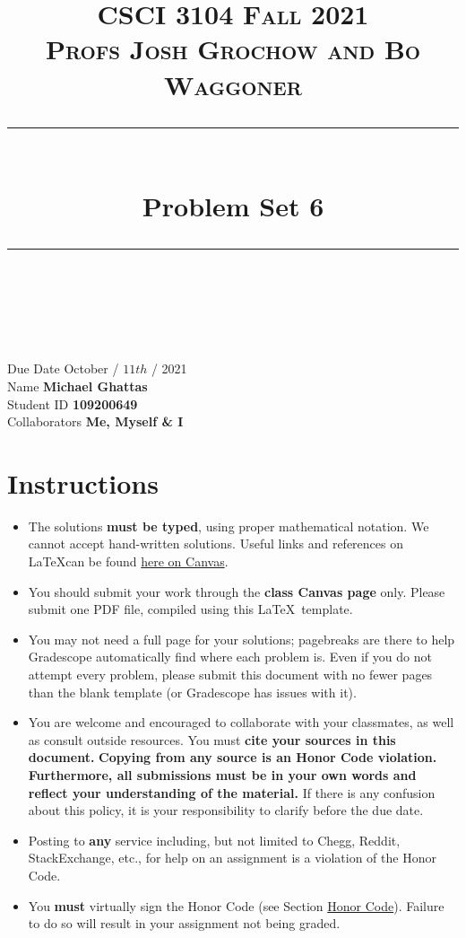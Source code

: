 \documentclass[11pt]{article}
\title{
\normalfont \normalsize 
\textsc{CSCI 3104 Fall 2021 \\ 
Profs Josh Grochow and Bo Waggoner} \\
[10pt] 
\rule{\linewidth}{0.5pt} \\[6pt] 
\huge Problem Set 6 \\
\rule{\linewidth}{2pt}  \\[10pt]
}
\date{}
\theoremstyle{definition}
\theoremstyle{definition}
\theoremstyle{definition}
\begin{document}
\maketitle


\noindent
Due Date \dotfill October / $11{th}$ / 2021 \\
Name \dotfill \textbf{Michael Ghattas} \\
Student ID \dotfill \textbf{109200649} \\
Collaborators \dotfill \textbf{Me, Myself \& I}

\tableofcontents

\section*{Instructions}
 \begin{itemize}
	\item The solutions \textbf{must be typed}, using proper mathematical notation. We cannot accept hand-written solutions. Useful links and references on \LaTeX can be found \href{https://canvas.colorado.edu/courses/75824/pages/latex}{here on Canvas}.
	\item You should submit your work through the \textbf{class Canvas page} only. Please submit one PDF file, compiled using this \LaTeX \ template.
	\item You may not need a full page for your solutions; pagebreaks are there to help Gradescope automatically find where each problem is. Even if you do not attempt every problem, please submit this document with no fewer pages than the blank template (or Gradescope has issues with it).

	\item You are welcome and encouraged to collaborate with your classmates, as well as consult outside resources. You must \textbf{cite your sources in this document.} \textbf{Copying from any source is an Honor Code violation. Furthermore, all submissions must be in your own words and reflect your understanding of the material.} If there is any confusion about this policy, it is your responsibility to clarify before the due date. 

	\item Posting to \textbf{any} service including, but not limited to Chegg, Reddit, StackExchange, etc., for help on an assignment is a violation of the Honor Code.

	\item You \textbf{must} virtually sign the Honor Code (see Section \hyperlink{HonorCode}{Honor Code}). Failure to do so will result in your assignment not being graded.
\end{itemize}
\end{document}

